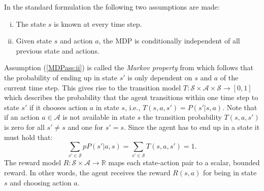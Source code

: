 In the standard formulation the following two assumptions are made:
\begin{enumerate}[(i)]
    \item\label{MDPass:i} The state $s$ is known at every time step.
    \item\label{MDPass:ii} Given state $s$ and action $a$, the MDP is conditionally independent of all previous state and actions.
\end{enumerate}
Assumption (\ref{MDPass:ii}) is called the \textit{Markov property} from which follows that the probability of ending up in  state $s'$ is only dependent on $s$ and $a$ of the current time step. This gives rise to the transition model $T:\mathcal{S}\times\mathcal{A}\times\mathcal{S}\rightarrow [0,1]$ which describes the probability that the agent transitions within one time step to state $s'$ if it chooses action $a$ in state $s$, i.e., $T(s,a,s')=P(s'|s,a)$. Note that if an action $a\in\mathcal{A}$ is not available in state $s$ the transition probability $T(s,a,s')$ is zero for all $s'\neq s$ and one for $s'=s$. 
Since the agent has to end up in a state it must hold that:
%
\begin{equation}
    \sum_{s'\in\mathcal{S}}pP(s'|a,s)=\sum_{s'\in\mathcal{S}}T(s,a,s')=1.
\end{equation}
%
The reward model $R:\mathcal{S}\times\mathcal{A}\rightarrow \mathbb{R}$ maps each state-action pair to a scalar, bounded reward. In other words, the agent receives the reward $R(s,a)$ for being in state $s$ and choosing action $a$.\\

